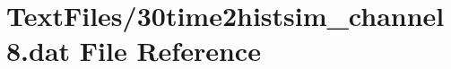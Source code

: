 \hypertarget{30time2histsim__channel8_8dat}{}\section{Text\+Files/30time2histsim\+\_\+channel8.dat File Reference}
\label{30time2histsim__channel8_8dat}
